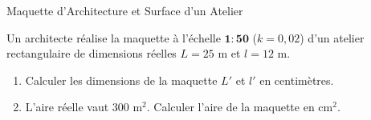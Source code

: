 \begin{exercice}[3 pts][\capRealiser]{Maquette d'Architecture et Surface d'un Atelier}
\noindent
\begin{minipage}[c]{0.58\linewidth}
Un architecte réalise la maquette à l'échelle $\mathbf{1:50}$ ($k = 0{,}02$) d'un atelier rectangulaire de dimensions réelles $L = 25\text{ m}$ et $l = 12\text{ m}$.
\begin{enumerate}[leftmargin=1.2em, itemsep=1pt]
    \item Calculer les dimensions de la maquette $L'$ et $l'$ en centimètres.
    \item L'aire réelle vaut $300\text{ m}^2$. Calculer l'aire de la maquette en $\text{cm}^2$.
\end{enumerate}
\end{minipage}\hfill
\begin{minipage}[c]{0.38\linewidth}
\centering
{}
\end{minipage}

\vspace{1mm}
\lignesreponse[2]
\end{exercice}

\newpage

